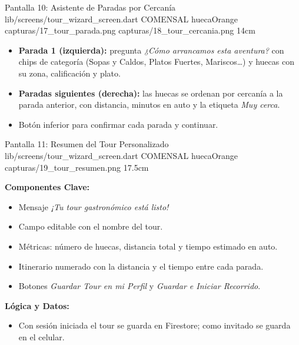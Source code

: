 \pantalladoble
  {Pantalla 10: Asistente de Paradas por Cercanía}
  {lib/screens/tour\_wizard\_screen.dart}
  {COMENSAL}
  {huecaOrange}
  {capturas/17_tour_parada.png}
  {capturas/18_tour_cercania.png}
  {14cm}
  {
    \begin{itemize}[leftmargin=*, itemsep=2pt]
      \item \textbf{Parada 1 (izquierda):} pregunta \textit{¿Cómo arrancamos esta aventura?} con chips de categoría (Sopas y Caldos, Platos Fuertes, Mariscos\dots) y huecas con su zona, calificación y plato.
      \item \textbf{Paradas siguientes (derecha):} las huecas se ordenan por cercanía a la parada anterior, con distancia, minutos en auto y la etiqueta \textit{Muy cerca}.
      \item Botón inferior para confirmar cada parada y continuar.
    \end{itemize}
  }

\pantallashowcase
  {Pantalla 11: Resumen del Tour Personalizado}
  {lib/screens/tour\_wizard\_screen.dart}
  {COMENSAL}
  {huecaOrange}
  {capturas/19_tour_resumen.png}
  {17.5cm}
  {

    \textbf{Componentes Clave:}
    \begin{itemize}[leftmargin=*, itemsep=2pt]
      \item Mensaje \textit{¡Tu tour gastronómico está listo!}
      \item Campo editable con el nombre del tour.
      \item Métricas: número de huecas, distancia total y tiempo estimado en auto.
      \item Itinerario numerado con la distancia y el tiempo entre cada parada.
      \item Botones \textit{Guardar Tour en mi Perfil} y \textit{Guardar e Iniciar Recorrido}.
    \end{itemize}
    \vspace{0.2cm}

    \textbf{Lógica y Datos:}
    \begin{itemize}[leftmargin=*, itemsep=2pt]
      \item Con sesión iniciada el tour se guarda en Firestore; como invitado se guarda en el celular.
    \end{itemize}
  }


